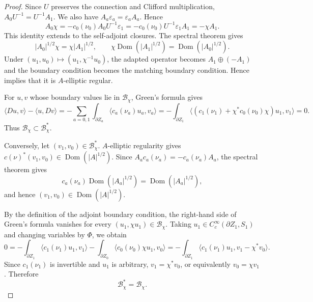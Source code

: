 \documentclass[12pt,reqno]{amsart}
\numberwithin{equation}{section}
\theoremstyle{definition}
\begin{document}
\begin{proof}
Since $U$ preserves the connection and Clifford multiplication,
$A_0U^{-1}=U^{-1}A_1$.  We also have $A_a\varepsilon_a=\varepsilon_aA_a$.  Hence
\[
 A_0\chi
 =-c_0(\nu_0)A_0U^{-1}\varepsilon_1
 =-c_0(\nu_0)U^{-1}\varepsilon_1A_1
 =-\chi A_1.
\]
This identity extends to the self-adjoint closures.  The spectral
theorem gives
\[
 |A_0|^{1/2}\chi=\chi|A_1|^{1/2},\qquad
 \chi\operatorname{Dom}(|A_1|^{1/2})
 =\operatorname{Dom}(|A_0|^{1/2}).
\]
Under $(u_1,u_0)\mapsto(u_1,\chi^{-1}u_0)$, the adapted operator
becomes $A_1\oplus(-A_1)$ and the boundary condition becomes the
matching boundary condition. Hence
\cite[Proposition~7.35]{BaerBandara} implies that it is $A$-elliptic regular.

For $u,v$ whose boundary values lie in $\mathcal B_\chi$,
Green's formula \cite[Theorem~2.4(iv)]{BaerBandara} gives
\[
 \langle Du,v\rangle-\langle u,Dv\rangle
 =-\sum_{a=0,1}\int_{\partial Z_a}
       \langle c_a(\nu_a)u_a,v_a\rangle
 =-\int_{\partial Z_1}
 \langle(c_1(\nu_1)+\chi^*c_0(\nu_0)\chi)u_1,v_1\rangle=0.
\]
Thus $\mathcal B_\chi\subset\mathcal B_\chi^*$.

Conversely, let $(v_1,v_0)\in\mathcal B_\chi^*$. 
$A$-elliptic regularity gives $c(\nu)^*(v_1,v_0)\in\operatorname{Dom}(|A|^{1/2})$.
Since $A_ac_a(\nu_a)=-c_a(\nu_a)A_a$, the spectral theorem gives
\[
 c_a(\nu_a)\operatorname{Dom}(|A_a|^{1/2})
 =\operatorname{Dom}(|A_a|^{1/2}),
\]
and hence $(v_1,v_0)\in\operatorname{Dom}(|A|^{1/2})$.

By the definition of the adjoint boundary condition, the right-hand
side of Green's formula vanishes for every
$(u_1,\chi u_1)\in\mathcal B_\chi$.  Taking
$u_1\in C_c^\infty(\partial Z_1,S_1)$ and changing variables by
$\Phi$, we obtain
\[
 0
 =-\int_{\partial Z_1}\langle c_1(\nu_1)u_1,v_1\rangle
   -\int_{\partial Z_0}\langle c_0(\nu_0)\chi u_1,v_0\rangle
 =-\int_{\partial Z_1}
   \langle c_1(\nu_1)u_1,v_1-\chi^*v_0\rangle.
\]
Since $c_1(\nu_1)$ is invertible and $u_1$ is arbitrary,
$v_1=\chi^*v_0$, or equivalently $v_0=\chi v_1$.  Therefore
\begin{equation}\label{eq:adjoint-boundary-condition}
 \mathcal B_\chi^*=\mathcal B_\chi.
\end{equation}
\end{proof}
\end{document}
